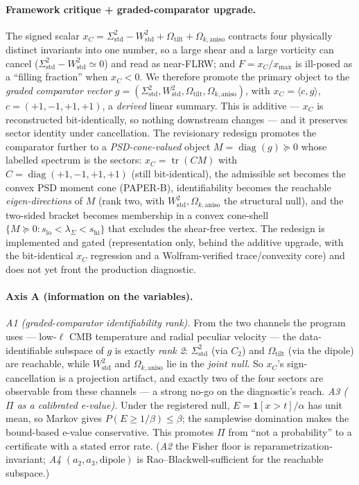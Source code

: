 \documentclass[11pt,a4paper]{article}
\newcommand{\xC}{x_{C}}
\newcommand{\xmax}{x_{\max}}
\newcommand{\Sigstd}{\Sigma^{2}_{\mathrm{std}}}
\newcommand{\Wstd}{W^{2}_{\mathrm{std}}}
\newcommand{\Otilt}{\Omega_{\mathrm{tilt}}}
\newcommand{\Okaniso}{\Omega_{k,\mathrm{aniso}}}
\theoremstyle{plain}
\theoremstyle{definition}
\begin{document}
\paragraph{Framework critique + graded-comparator upgrade.} The signed scalar
$\xC=\Sigstd-\Wstd+\Otilt+\Okaniso$ contracts four physically distinct
invariants into one number, so a large shear and a large vorticity can cancel
($\Sigstd-\Wstd\simeq0$) and read as near-FLRW; and $F=\xC/\xmax$ is ill-posed as
a ``filling fraction'' when $\xC<0$. We therefore promote the primary object to
the \emph{graded comparator vector} $g=(\Sigstd,\Wstd,\Otilt,\Okaniso)$, with
$\xC=\langle c,g\rangle$, $c=(+1,-1,+1,+1)$, a \emph{derived} linear summary.
This is additive --- $\xC$ is reconstructed bit-identically, so nothing
downstream changes --- and it preserves sector identity under cancellation. The
revisionary redesign promotes the comparator further to a \emph{PSD-cone-valued}
object $M=\operatorname{diag}(g)\succeq0$ whose labelled spectrum is the sectors:
$\xC=\operatorname{tr}(CM)$ with $C=\operatorname{diag}(+1,-1,+1,+1)$ (still
bit-identical), the admissible set becomes the convex PSD moment cone
(PAPER-B), identifiability becomes the reachable \emph{eigen-directions} of $M$
(rank two, with $\Wstd,\Okaniso$ the structural null), and the two-sided bracket
becomes membership in a convex cone-shell $\{M\succeq0:s_{\mathrm{lo}}<\lambda_\Sigma<s_{\mathrm{hi}}\}$
that excludes the shear-free vertex. The redesign is implemented and gated
(representation only, behind the additive upgrade, with the bit-identical $\xC$
regression and a Wolfram-verified trace/convexity core) and does not yet front
the production diagnostic.

\paragraph{Axis A (information on the variables).} \emph{A1 (graded-comparator
identifiability rank).} From the two channels the program uses --- low-$\ell$
CMB temperature and radial peculiar velocity --- the data-identifiable subspace
of $g$ is exactly \emph{rank 2}: $\Sigstd$ (via $C_2$) and $\Otilt$ (via the
dipole) are reachable, while $\Wstd$ and $\Okaniso$ lie in the \emph{joint null}.
So $\xC$'s sign-cancellation is a projection artifact, and exactly two of the
four sectors are observable from these channels --- a strong no-go on the
diagnostic's reach. \emph{A3 ($\Pi$ as a calibrated e-value).} Under the
registered null, $E=\mathbf 1[x>t]/\alpha$ has unit mean, so Markov gives
$P(E\ge1/\beta)\le\beta$; the samplewise domination makes the bound-based
e-value conservative. This promotes $\Pi$ from ``not a probability'' to a
certificate with a stated error rate. (\emph{A2} the Fisher floor is
reparametrization-invariant; \emph{A4} $(a_2,a_3,\text{dipole})$ is
Rao--Blackwell-sufficient for the reachable subspace.)
\end{document}
